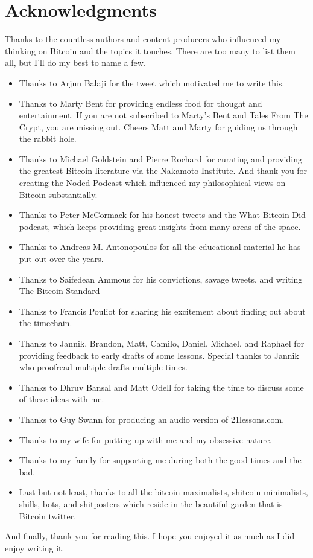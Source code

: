 \chapter*{Acknowledgments}

Thanks to the countless authors and content producers who influenced my thinking
on Bitcoin and the topics it touches. There are too many to list them all, but
I’ll do my best to name a few.

\begin{itemize}
  \item Thanks to Arjun Balaji for the tweet which motivated me to write this.
  \item Thanks to Marty Bent for providing endless food for thought and entertainment. If you are not subscribed to Marty’s Bent and Tales From The Crypt, you are missing out. Cheers Matt and Marty for guiding us through the rabbit hole.
  \item Thanks to Michael Goldstein and Pierre Rochard for curating and providing the greatest Bitcoin literature via the Nakamoto Institute. And thank you for creating the Noded Podcast which influenced my philosophical views on Bitcoin substantially.
  \item Thanks to Peter McCormack for his honest tweets and the What Bitcoin Did podcast, which keeps providing great insights from many areas of the space.
  \item Thanks to Andreas M. Antonopoulos for all the educational material he has put out over the years.
  \item Thanks to Saifedean Ammous for his convictions, savage tweets, and writing The Bitcoin Standard
  \item Thanks to Francis Pouliot for sharing his excitement about finding out about the timechain.
  \item Thanks to Jannik, Brandon, Matt, Camilo, Daniel, Michael, and Raphael for providing feedback to early drafts of some lessons. Special thanks to Jannik who proofread multiple drafts multiple times.
  \item Thanks to Dhruv Bansal and Matt Odell for taking the time to discuss some of these ideas with me.
  \item Thanks to Guy Swann for producing an audio version of 21lessons.com.
  \item Thanks to my wife for putting up with me and my obsessive nature.
  \item Thanks to my family for supporting me during both the good times and the bad.
  \item Last but not least, thanks to all the bitcoin maximalists, shitcoin minimalists, shills, bots, and shitposters which reside in the beautiful garden that is Bitcoin twitter.
\end{itemize}

And finally, thank you for reading this. I hope you enjoyed it as much as I did enjoy writing it.
